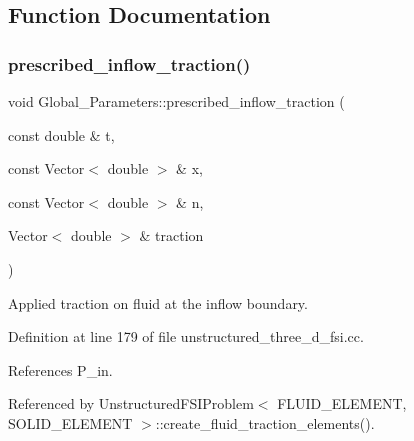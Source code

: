\subsection{Function Documentation}
\mbox{\label{namespaceGlobal__Parameters_af7faf65214ed9ead637f7c208addb095}} 
\subsubsection{\texorpdfstring{prescribed\+\_\+inflow\+\_\+traction()}{prescribed\_inflow\_traction()}}
{\footnotesize\ttfamily void Global\+\_\+\+Parameters\+::prescribed\+\_\+inflow\+\_\+traction (\begin{DoxyParamCaption}\item[{const double \&}]{t,  }\item[{const Vector$<$ double $>$ \&}]{x,  }\item[{const Vector$<$ double $>$ \&}]{n,  }\item[{Vector$<$ double $>$ \&}]{traction }\end{DoxyParamCaption})}



Applied traction on fluid at the inflow boundary. 



Definition at line 179 of file unstructured\+\_\+three\+\_\+d\+\_\+fsi.\+cc.



References P\+\_\+in.



Referenced by Unstructured\+F\+S\+I\+Problem$<$ F\+L\+U\+I\+D\+\_\+\+E\+L\+E\+M\+E\+N\+T, S\+O\+L\+I\+D\+\_\+\+E\+L\+E\+M\+E\+N\+T $>$\+::create\+\_\+fluid\+\_\+traction\+\_\+elements().

\mbox{\label{namespaceGlobal__Parameters_a83155358b144cff7e29ecb6b209a2d3e}} 
